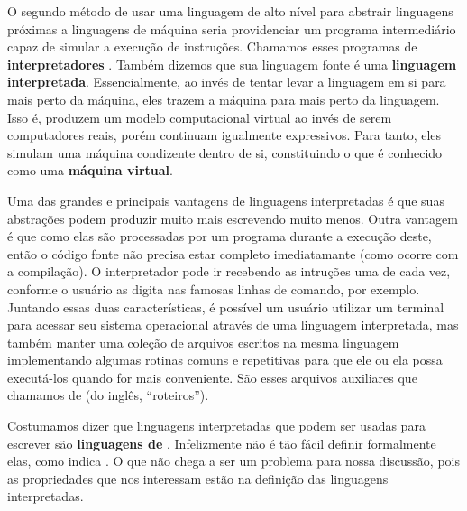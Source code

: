     O segundo método de usar uma linguagem de alto nível para abstrair
    linguagens próximas a linguagens de máquina seria providenciar um programa
    intermediário capaz de simular a execução de instruções. Chamamos esses
    programas de \textbf{interpretadores} \cite{pl:00}. Também dizemos que sua
    linguagem fonte é uma \textbf{linguagem interpretada}. Essencialmente, ao
    invés de tentar levar a linguagem em si para mais perto da máquina, eles
    trazem a máquina para mais perto da linguagem. Isso é, produzem um modelo
    computacional virtual ao invés de serem computadores reais, porém continuam
    igualmente expressivos. Para tanto, eles simulam uma máquina condizente
    dentro de si, constituindo o que é conhecido como uma \textbf{máquina virtual}.


    Uma das grandes e principais vantagens de linguagens interpretadas é que
    suas abstrações podem produzir muito mais escrevendo muito menos. Outra
    vantagem é que como elas são processadas por um programa durante a execução
    deste, então o código fonte não precisa estar completo imediatamante (como
    ocorre com a compilação). O interpretador pode ir recebendo as intruções uma
    de cada vez, conforme o usuário as digita nas famosas linhas de comando, por
    exemplo. Juntando essas duas  características, é possível um usuário
    utilizar um terminal para acessar seu sistema operacional através de uma
    linguagem interpretada, mas também manter uma coleção de arquivos escritos
    na mesma linguagem implementando algumas rotinas comuns e repetitivas para
    que ele ou ela possa executá-los quando for mais conveniente. São esses
    arquivos auxiliares que chamamos de \textbf{} (do inglês,
    ``roteiros'').

    Costumamos dizer que linguagens interpretadas que podem ser usadas
    para escrever  são \textbf{linguagens de \script{}}. Infelizmente
    não é tão fácil definir formalmente elas, como indica \cite{script:00}. O
    que não chega a ser um problema para nossa discussão, pois as propriedades
    que nos interessam estão na definição das linguagens interpretadas.

